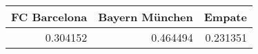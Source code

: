 \begin{tabular}{rrr}
\hline
   FC Barcelona &   Bayern München &   Empate \\
\hline
       0.304152 &         0.464494 & 0.231351 \\
\hline
\end{tabular}